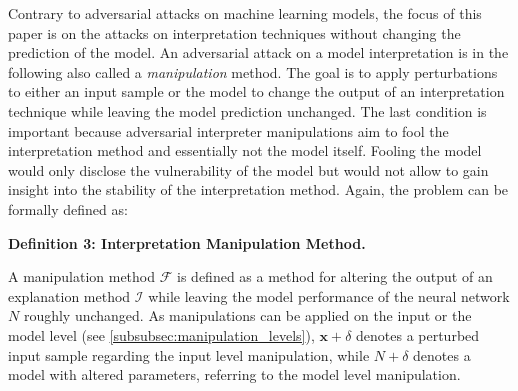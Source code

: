 Contrary to adversarial attacks on machine learning models, the focus of this paper is on the attacks on interpretation techniques without changing the prediction of the model. 
An adversarial attack on a model interpretation is in the following also called a \textit{manipulation} method. 
The goal is to apply perturbations to either an input sample or the model to change the output of an interpretation technique while leaving the model prediction unchanged. The last condition is important because adversarial interpreter manipulations aim to fool the interpretation method and essentially not the model itself. 
Fooling the model would only disclose the vulnerability of the model but would not allow to gain insight into the stability of the interpretation method. 
Again, the problem can be formally defined as:

\par\smallskip
\textbf{Definition 3: Interpretation Manipulation Method.}

\setlength{\leftskip}{0.39cm}
\noindent A manipulation method $\mathcal{F}$ is defined as a method for altering the output of an explanation method $\mathcal{I}$ while leaving the model performance of the neural network $N$ roughly unchanged. 
As manipulations can be applied on the input or the model level (see \autoref{subsubsec:manipulation_levels}), $\mathbf{x}+\delta$ denotes a perturbed input sample regarding the input level manipulation, while $N+\delta$ denotes a model with altered parameters, referring to the model level manipulation.

